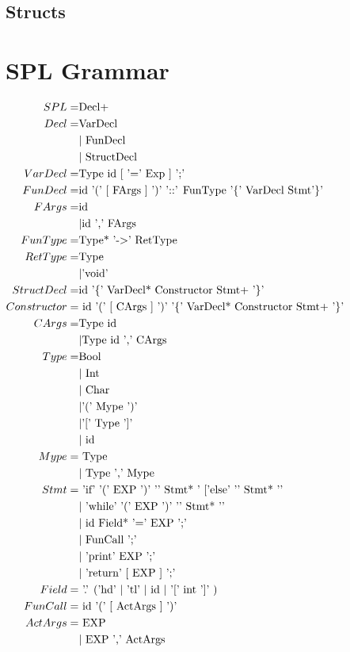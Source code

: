 \documentclass[10pt,a4paper]{article}
\begin{document}
\subsection{Structs}


\appendix
\section{SPL Grammar}
\begin{math}
\centering
\begin{aligned}
SPL =& \text{Decl+}\\
Decl  =& \text{VarDecl}
 \\&| \text{ FunDecl }
 \\&| \text{ StructDecl}\\
VarDecl =& \text{Type id [ '=' Exp ] ';'}\\
FunDecl =& \text{id '(' [ FArgs ] ')' '::' FunType '\{' VarDecl Stmt'\}' }\\
FArgs =& \text{id }
 \\&| \text{id ',' FArgs}\\
FunType =& \text{Type* '-$>$' RetType}\\
RetType =& \text{Type}
 \\ &| \text{'void'} \\
StructDecl =& \text{id '\{' VarDecl* Constructor Stmt+ '\}'}\\
Constructor =&\text{ id '(' [ CArgs ] ')' '\{' VarDecl* Constructor Stmt+ '\}' }\\
CArgs =& \text{Type id }
 \\&| \text{Type id ',' CArgs}\\
Type =& \text{Bool}
 \\&| \text{ Int}
 \\&| \text{ Char}
 \\&| \text{'(' Mype ')'} 
 \\&| \text{'[' Type ']'} 
 \\&|\text{ id }\\
Mype =&\text{ Type}
 \\&|\text{ Type ',' Mype}\\
Stmt =&\text{ 'if' '(' EXP ')' '{' Stmt* '} ['else' '{' Stmt* '}'}
 \\&|\text{ 'while' '(' EXP ')' '{' Stmt* '}'}
 \\&|\text{ id Field* '=' EXP ';'}
 \\&|\text{ FunCall ';'}
 \\&|\text{ 'print' EXP ';'}
 \\&|\text{ 'return' [ EXP ] ';' }\\
Field =&\text{ '.' ('hd' $|$ 'tl' $|$ id $|$ '[' int ']' ) }\\
FunCall =&\text{ id '(' [ ActArgs ] ')'} \\
ActArgs =&\text{ EXP }
 \\&|\text{ EXP ',' ActArgs }
\end{aligned}
\end{math}
\end{document}
